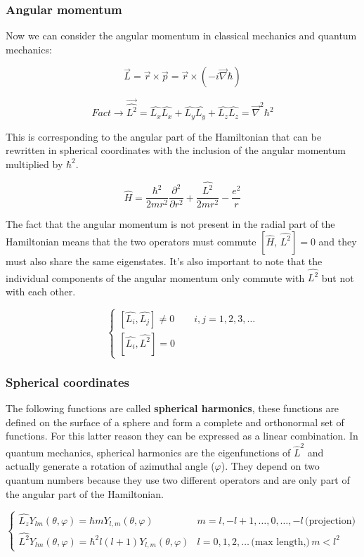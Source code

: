  		\subsubsection{Angular momentum}
		Now we can consider the angular momentum in classical mechanics and quantum mechanics:

		$$\vec{L}=\vec{r}\times\vec{p}=\vec{r}\times(-i\vec{\nabla}\hbar)$$


		$$\textit{Fact} \rightarrow \vec{\hat{L^2}}=\hat{L_x}\hat{L_x}+\hat{L_y}\hat{L_y}+\hat{L_z}\hat{L_z}=\vec{\nabla}^2\hbar^2$$

		This is corresponding to the angular part of the Hamiltonian that can be rewritten in spherical coordinates with the inclusion of the angular momentum multiplied by $\hbar^2$.

		$$\hat{H}=\frac{\hbar^2}{2mr^2}\frac{\partial^2}{\partial r^2}+\frac{\hat{L^2}}{2mr^2}-\frac{e^2}{r}$$

		The fact that the angular momentum is not present in the radial part of the Hamiltonian means that the two operators must commute $[\hat{H},\,\hat{L^2}]=0$ and they must also share the same eigenstates.
		It's also important to note that the individual components of the angular momentum only commute with $\hat{L^2}$ but not with each other.

		$$\begin{cases}[\hat{L_i},\hat{L_j}]\neq0 \qquad i,j=1, 2, 3, \dots \\ [\hat{L_i},\hat{L^2}]=0\end{cases}$$

		\subsubsection{Spherical coordinates}
		The following functions are called \textbf{spherical harmonics}, these functions are defined on the surface of a sphere and form a complete and orthonormal set of functions.
		For this latter reason they can be expressed as a linear combination.
		In quantum mechanics, spherical harmonics are the eigenfunctions of $\hat{L}^2$ and actually generate a rotation of azimuthal angle ($\varphi$).
		They depend on two quantum numbers because they use two different operators and are only part of the angular part of the Hamiltonian.

		$$\begin{cases}\hat{L_z}Y_{lm}(\theta,\varphi)=\hbar mY_{l,m}(\theta,\varphi) & m = l, -l+1,\dots, 0,\dots, -l \,\text{(projection)}\\ \hat{L^2}Y_{lm}(\theta,\varphi)=\hbar^2 l(l+1)Y_{l,m}(\theta,\varphi) & l = 0, 1, 2, \dots\,\text{(max length,)}\, m < l^2\end{cases}$$

